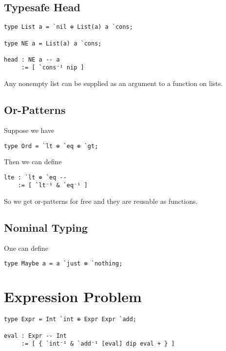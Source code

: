\documentclass{article}
\begin{document}
\subsection{Typesafe Head}

\begin{verbatim}
type List a = `nil ⊕ List(a) a `cons;

type NE a = List(a) a `cons;

head : NE a -- a
     := [ `cons⁻¹ nip ]
\end{verbatim}

Any nonempty list can be supplied as an argument to a function on lists.

\subsection{Or-Patterns}

Suppose we have

\begin{verbatim}
type Ord = `lt ⊕ `eq ⊕ `gt;
\end{verbatim}

Then we can define

\begin{verbatim}
lte : `lt ⊕ `eq --
    := [ `lt⁻¹ & `eq⁻¹ ]
\end{verbatim}

So we get or-patterns for free and they are reusable as functions.

\subsection{Nominal Typing}

One can define

\begin{verbatim}
type Maybe a = a `just ⊕ `nothing;
\end{verbatim}

\section{Expression Problem}

\begin{verbatim}
type Expr = Int `int ⊕ Expr Expr `add;

eval : Expr -- Int
     := [ { `int⁻¹ & `add⁻¹ [eval] dip eval + } ]
\end{verbatim}
\end{document}
